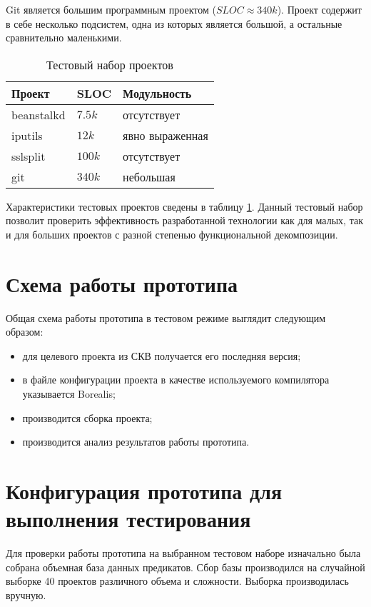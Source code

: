 Git является большим программным проектом ($SLOC \approx 340k$). Проект содержит в себе несколько подсистем, одна из которых является большой, а остальные сравнительно маленькими.

\begin{table}
	\caption{Тестовый набор проектов}
	\begin{center}
	\begin{tabular}{|l|l|l|}
	\hline 
	\textbf{Проект} & \textbf{SLOC} & \textbf{Модульность}	\\ 
	\hline 
	beanstalkd & $7.5k$ & отсутствует \\ 
	\hline 
	iputils & $12k$ & явно выраженная \\ 
	\hline 
	sslsplit & $100k$  & отсутствует \\ 
	\hline 
	git & $340k$ & небольшая \\ 
	\hline 
	\end{tabular} 
	\end{center}
	\label{table:testProjects}
\end{table}

Характеристики тестовых проектов сведены в таблицу \ref{table:testProjects}. Данный тестовый набор позволит проверить эффективность разработанной технологии как для малых, так и для больших проектов с разной степенью функциональной декомпозиции.

\section{Схема работы прототипа}
Общая схема работы прототипа в тестовом режиме выглядит следующим образом:
\begin{itemize}
\item для целевого проекта из СКВ получается его последняя версия;
\item в файле конфигурации проекта в качестве используемого компилятора указывается Borealis;
\item производится сборка проекта;
\item производится анализ результатов работы прототипа.
\end{itemize}

\section{Конфигурация прототипа для выполнения тестирования}
Для проверки работы прототипа на выбранном тестовом наборе изначально была собрана объемная база данных предикатов. Сбор базы производился на случайной выборке 40 проектов различного объема и сложности. Выборка производилась вручную.

